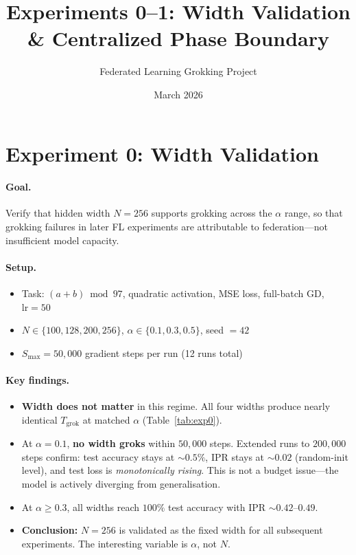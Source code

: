 \documentclass[11pt]{article}
\title{Experiments 0--1: Width Validation \& Centralized Phase Boundary}
\author{Federated Learning Grokking Project}
\date{March 2026}
\begin{document}
\maketitle

\section{Experiment 0: Width Validation}

\paragraph{Goal.} Verify that hidden width $N = 256$ supports grokking across the
$\alpha$ range, so that grokking failures in later FL experiments are attributable
to federation---not insufficient model capacity.

\paragraph{Setup.}
\begin{itemize}[nosep]
  \item Task: $(a + b) \bmod 97$, quadratic activation, MSE loss, full-batch GD, $\text{lr} = 50$
  \item $N \in \{100, 128, 200, 256\}$, \;$\alpha \in \{0.1, 0.3, 0.5\}$, \;seed $= 42$
  \item $S_{\max} = 50{,}000$ gradient steps per run (12 runs total)
\end{itemize}

\paragraph{Key findings.}
\begin{itemize}[nosep]
  \item \textbf{Width does not matter} in this regime.
        All four widths produce nearly identical $T_{\text{grok}}$ at matched $\alpha$
        (Table~\ref{tab:exp0}).
  \item At $\alpha = 0.1$, \textbf{no width groks} within $50{,}000$ steps.
        Extended runs to $200{,}000$ steps confirm: test accuracy stays at $\sim 0.5\%$,
        IPR stays at $\sim 0.02$ (random-init level), and test loss is
        \emph{monotonically rising}. This is not a budget issue---the model is
        actively diverging from generalisation.
  \item At $\alpha \geq 0.3$, all widths reach $100\%$ test accuracy with
        IPR $\sim 0.42$--$0.49$.
  \item \textbf{Conclusion:} $N = 256$ is validated as the fixed width for all
        subsequent experiments. The interesting variable is $\alpha$, not $N$.
\end{itemize}
\end{document}
